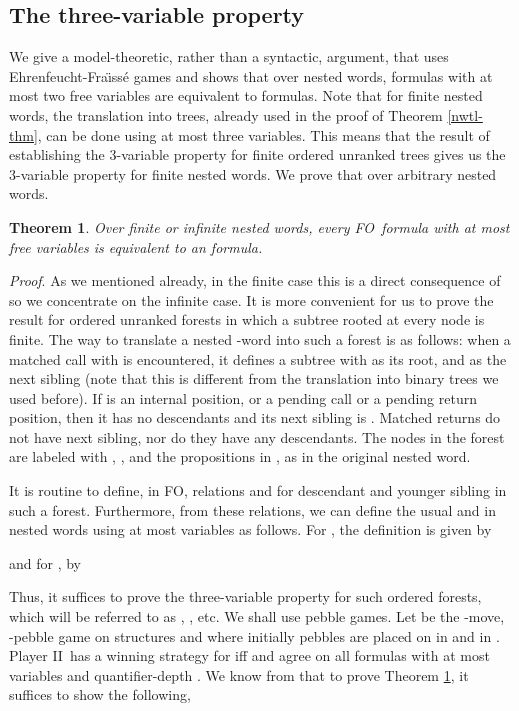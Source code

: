 \documentclass{LMCS}
\newcommand{\dupl}{Player II}
\newcommand{\FO}{{\rm FO}}
\theoremstyle{plain}
\newtheorem{theorem}{Theorem}[section]
\theoremstyle{definition}
\begin{document}
\subsection{The three-variable property}

\newcommand{\sland}{\;\land\;}
\newcommand{\abs}[1]{ \vert #1 \vert }

We give a model-theoretic, rather than a syntactic,
argument, that uses 
Ehrenfeucht-Fra\"{\i}ss\'e games and shows that over nested words, 
formulas with at most two free variables are equivalent to
 formulas. Note that for finite nested words, the translation
into trees, already used in the proof of Theorem \ref{nwtl-thm}, can
be done using at most three variables. This means that the result of
\cite{marx-tods} establishing the 3-variable property for finite
ordered unranked trees gives us the 3-variable property for finite
nested words. We prove that  over arbitrary
nested words.

\begin{theorem}\label{3var th}
Over finite or infinite nested words, every \FO\ formula with at most
 free variables is equivalent to an  formula.
\end{theorem}


{\em Proof}.
As we mentioned already, in the finite case this is a direct
consequence of \cite{marx-tods} so we concentrate on the infinite
case.  
It is more convenient for us to prove the result for ordered
unranked forests in which a subtree rooted at every node is
finite. The way to translate a nested -word into such a
forest is as follows: when a 
matched call  with  is encountered,
it defines a subtree with  as its root, and  as the next
sibling (note that this is different from the translation into binary
trees we used before). 
If  is an internal position, or a pending call or a pending
return position, then it has no descendants and its next sibling is .
Matched returns do not have next sibling, nor do they have any descendants.
The nodes in the forest are labeled with , ,
and the propositions in , as in the original nested word.


It is routine to define, in \FO, relations  and  for 
descendant and younger sibling in such a forest. Furthermore, from
these relations, we can define the usual  and  in nested
words using at most  variables as follows. For , the
definition is given by

and for , by
 
Thus, it suffices to prove the three-variable property for such
ordered forests, which will be referred to as , , etc.
We shall use pebble games. Let 
 be the -move, -pebble game on structures 
and  where initially pebbles  are placed on  in  and
 in .  \dupl\ has a winning strategy for  iff  and  agree on all
formulas with at most  variables and quantifier-depth .  
We know from \cite{IK}
that to prove Theorem \ref{3var th}, it suffices to show
the following,
\end{document}
